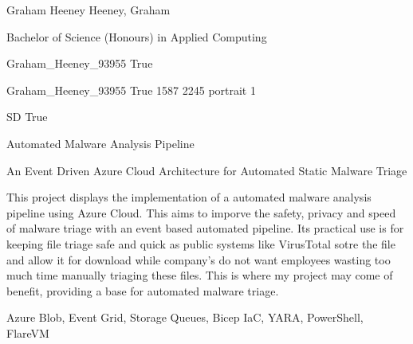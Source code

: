 \documentclass[twoside]{report}
\begin{document}
\begingroup{}\relax



\def\Key{Graham_Heeney_93955}

{Graham Heeney}
{Heeney, Graham}

{Bachelor of Science (Honours) in Applied Computing}

{Graham_Heeney_93955}
{True}

{Graham_Heeney_93955}
{True}
{1587}
{2245}
{portrait}
{1}

{SD}
{True}

{Automated Malware Analysis Pipeline}

{An Event Driven Azure Cloud Architecture for Automated Static Malware Triage}

{This project displays the implementation of a automated malware analysis pipeline using Azure Cloud. This aims to imporve the safety, privacy and speed of malware triage with an event based automated pipeline. Its practical use is for keeping file triage safe and quick as public systems like VirusTotal sotre the file and allow it for download while company's do not want employees wasting too much time manually triaging these files. This is where my project may come of benefit, providing a base for automated malware triage.}

{Azure Blob, Event Grid, Storage Queues, Bicep IaC, YARA, PowerShell, FlareVM}
\end{document}
